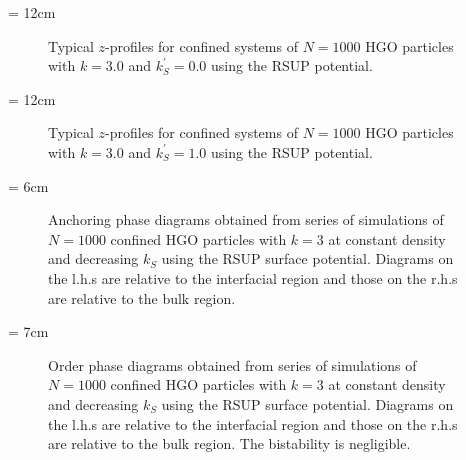 \picW = 12cm
\begin{figure}
	\centering
	\caption{Typical $z$-profiles for confined systems of $N=1000$ HGO particles with 
	$k=3.0$ and $k^{'}_S = 0.0$ using the RSUP potential.}
	\label{fig:RSUP_typeProf_k3_homeo}
\end{figure}


\picW = 12cm
\begin{figure}
	\centering
	\caption{Typical $z$-profiles for confined systems of $N=1000$ HGO particles with 
	$k=3.0$ and $k^{'}_S = 1.0$ using the RSUP potential.}
	\label{fig:RSUP_typeProf_k3_planar}
\end{figure}

\picW = 6cm
\begin{figure}
	\centering
	\caption{Anchoring phase diagrams obtained from series of simulations of $N=1000$
	confined HGO particles with $k=3$ at constant density and decreasing $k_S$ 
	using the RSUP surface potential. Diagrams on the l.h.s are relative to the interfacial
	region and those on the r.h.s are relative to the bulk region.}
	\label{fig:QzzWaPhaseDia_k3_RSUP}
\end{figure}



\picW = 7cm
\begin{figure}
	\centering
	\caption{Order phase diagrams obtained from series of simulations of $N=1000$
	confined HGO particles with $k=3$ at constant density and decreasing $k_S$ 
	using the RSUP surface potential. Diagrams on the l.h.s are relative to the interfacial
	region and those on the r.h.s are relative to the bulk region. The bistability is
	negligible.}
	\label{fig:SWaPhaseDia_k3_RSUP}
\end{figure}



